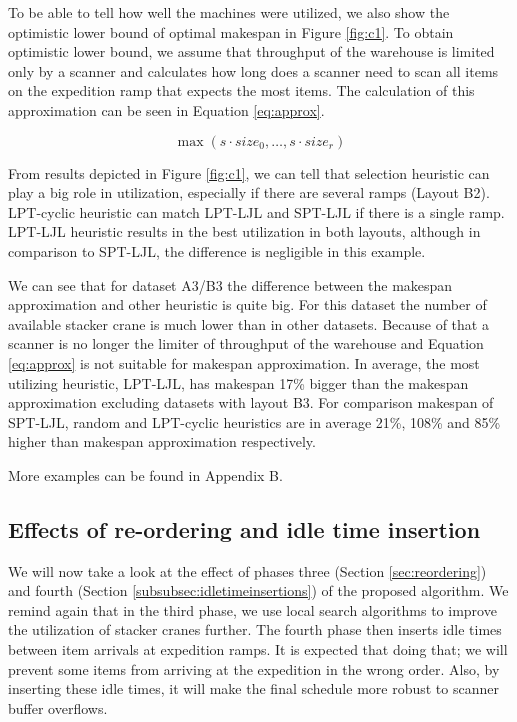 \documentclass{ctuthesis}
\begin{document}
To be able to tell how well the machines were utilized, we also show the optimistic lower bound of optimal makespan in Figure \ref{fig:c1}. To obtain optimistic lower bound, we assume that throughput of the warehouse is limited only by a scanner and calculates how long does a scanner need to scan all items on the expedition ramp that expects the most items. The calculation of this approximation can be seen in Equation \ref{eq:approx}.

\begin{equation}
\label{eq:approx}
    \max(s \cdot size_0, \ldots, s \cdot size_r)
\end{equation}


From results depicted in Figure \ref{fig:c1}, we can tell that selection heuristic can play a big role in utilization, especially if there are several ramps (Layout B2). LPT-cyclic heuristic can match LPT-LJL and SPT-LJL if there is a single ramp. LPT-LJL heuristic results in the best utilization in both layouts, although in comparison to SPT-LJL, the difference is negligible in this example.

We can see that for dataset A3/B3 the difference between the makespan approximation and other heuristic is quite big. For this dataset the number of available stacker crane is much lower than in other datasets. Because of that a scanner is no longer the limiter of throughput of the warehouse and Equation \ref{eq:approx} is not suitable for makespan approximation. In average,  the most utilizing heuristic, LPT-LJL, has makespan 17\% bigger than the makespan approximation excluding datasets with layout B3. For comparison makespan of SPT-LJL, random and LPT-cyclic heuristics are in average 21\%, 108\% and 85\% higher than makespan approximation respectively.

More examples can be found in Appendix B.

\subsection{Effects of re-ordering and idle time insertion}

We will now take a look at the effect of phases three (Section \ref{sec:reordering}) and fourth (Section \ref{subsubsec:idletimeinsertions}) of the proposed algorithm. We remind again that in the third phase, we use local search algorithms to improve the utilization of stacker cranes further. The fourth phase then inserts idle times between item arrivals at expedition ramps. It is expected that doing that; we will prevent some items from arriving at the expedition in the wrong order. Also, by inserting these idle times, it will make the final schedule more robust to scanner buffer overflows.
\end{document}
